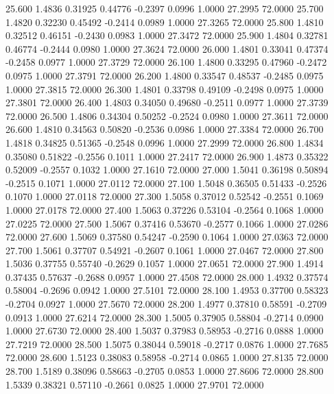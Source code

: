   25.600   1.4836   0.31925   0.44776  -0.2397   0.0996   1.0000  27.2995  72.0000
  25.700   1.4820   0.32230   0.45492  -0.2414   0.0989   1.0000  27.3265  72.0000
  25.800   1.4810   0.32512   0.46151  -0.2430   0.0983   1.0000  27.3472  72.0000
  25.900   1.4804   0.32781   0.46774  -0.2444   0.0980   1.0000  27.3624  72.0000
  26.000   1.4801   0.33041   0.47374  -0.2458   0.0977   1.0000  27.3729  72.0000
  26.100   1.4800   0.33295   0.47960  -0.2472   0.0975   1.0000  27.3791  72.0000
  26.200   1.4800   0.33547   0.48537  -0.2485   0.0975   1.0000  27.3815  72.0000
  26.300   1.4801   0.33798   0.49109  -0.2498   0.0975   1.0000  27.3801  72.0000
  26.400   1.4803   0.34050   0.49680  -0.2511   0.0977   1.0000  27.3739  72.0000
  26.500   1.4806   0.34304   0.50252  -0.2524   0.0980   1.0000  27.3611  72.0000
  26.600   1.4810   0.34563   0.50820  -0.2536   0.0986   1.0000  27.3384  72.0000
  26.700   1.4818   0.34825   0.51365  -0.2548   0.0996   1.0000  27.2999  72.0000
  26.800   1.4834   0.35080   0.51822  -0.2556   0.1011   1.0000  27.2417  72.0000
  26.900   1.4873   0.35322   0.52009  -0.2557   0.1032   1.0000  27.1610  72.0000
  27.000   1.5041   0.36198   0.50894  -0.2515   0.1071   1.0000  27.0112  72.0000
  27.100   1.5048   0.36505   0.51433  -0.2526   0.1070   1.0000  27.0118  72.0000
  27.300   1.5058   0.37012   0.52542  -0.2551   0.1069   1.0000  27.0178  72.0000
  27.400   1.5063   0.37226   0.53104  -0.2564   0.1068   1.0000  27.0225  72.0000
  27.500   1.5067   0.37416   0.53670  -0.2577   0.1066   1.0000  27.0286  72.0000
  27.600   1.5069   0.37580   0.54247  -0.2590   0.1064   1.0000  27.0363  72.0000
  27.700   1.5061   0.37707   0.54921  -0.2607   0.1061   1.0000  27.0467  72.0000
  27.800   1.5036   0.37755   0.55740  -0.2629   0.1057   1.0000  27.0651  72.0000
  27.900   1.4914   0.37435   0.57637  -0.2688   0.0957   1.0000  27.4508  72.0000
  28.000   1.4932   0.37574   0.58004  -0.2696   0.0942   1.0000  27.5101  72.0000
  28.100   1.4953   0.37700   0.58323  -0.2704   0.0927   1.0000  27.5670  72.0000
  28.200   1.4977   0.37810   0.58591  -0.2709   0.0913   1.0000  27.6214  72.0000
  28.300   1.5005   0.37905   0.58804  -0.2714   0.0900   1.0000  27.6730  72.0000
  28.400   1.5037   0.37983   0.58953  -0.2716   0.0888   1.0000  27.7219  72.0000
  28.500   1.5075   0.38044   0.59018  -0.2717   0.0876   1.0000  27.7685  72.0000
  28.600   1.5123   0.38083   0.58958  -0.2714   0.0865   1.0000  27.8135  72.0000
  28.700   1.5189   0.38096   0.58663  -0.2705   0.0853   1.0000  27.8606  72.0000
  28.800   1.5339   0.38321   0.57110  -0.2661   0.0825   1.0000  27.9701  72.0000
